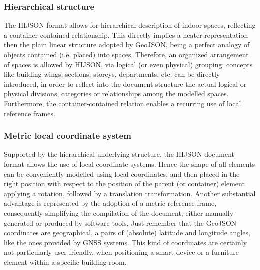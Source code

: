 \documentclass[]{egpubl}
\begin{document}

\subsubsection*{Hierarchical structure}

The HIJSON format allows for hierarchical description of indoor spaces,
reflecting a container-contained relationship. This directly implies a neater
representation then the plain linear structure adopted by GeoJSON, being a
perfect analogy of objects contained (i.e. placed) into spaces. Therefore, an
organized arrangement of spaces is allowed by HIJSON, via logical (or even
physical) grouping: concepts like building wings, sections, storeys,
departments, etc. can be directly introduced, in order to reflect into the
document structure the actual logical or physical divisions, categories or
relationships among the modelled spaces. Furthermore, the container-contained
relation enables a recurring use of local reference frames.

\subsubsection*{Metric local coordinate system}

Supported by the hierarchical underlying structure, the HIJSON document format
allows the use of local coordinate systems. Hence the shape of all elements
can be conveniently modelled using local coordinates, and then placed in the
right position with respect to the position of the parent (or container)
element applying a rotation, followed by a translation transformation. Another
substantial advantage is represented by the adoption of a metric reference
frame, consequently simplifying the compilation of the document, either
manually generated or produced by software tools. Just remember that the
GeoJSON coordinates are geographical, a pairs of (absolute) latitude and
longitude angles, like the ones provided by GNSS systems. This kind of
coordinates are certainly not particularly user friendly, when positioning a
smart device or a furniture element within a specific building room.
\end{document}
